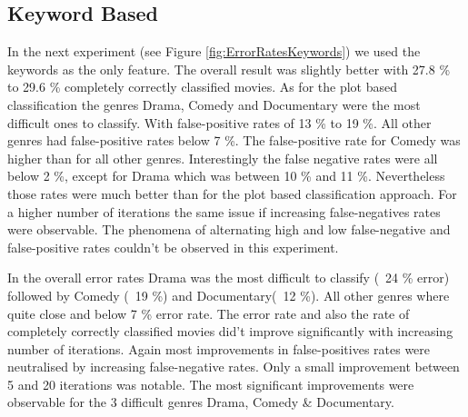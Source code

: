 \documentclass{vldb}
\begin{document}
\subsection{Keyword Based}
\par In the next experiment (see Figure \ref{fig:ErrorRatesKeywords})  we used the keywords as the only feature. The overall result was slightly better with 27.8 \% to 29.6 \% completely correctly classified movies.
As for the plot based classification the genres Drama, Comedy and Documentary were the most difficult  ones to classify. With false-positive rates of 13 \% to 19 \%. All other genres had false-positive rates below 7 \%. 
The false-positive rate for Comedy was higher than for all other genres. Interestingly the false negative rates were all below 2 \%, except for Drama which was between 10 \% and 11 \%. Nevertheless those rates were much better than for the plot based classification approach. For a higher number of iterations the same issue if increasing false-negatives rates were observable. The phenomena of alternating high and low false-negative and false-positive rates couldn’t be observed in this experiment.
\par In the overall error rates Drama was the most difficult to classify (~24 \% error) followed by Comedy (~19 \%) and Documentary(~12 \%). All other genres where quite close and below 7 \% error rate. The error rate and also the rate of completely correctly classified movies did’t improve significantly with increasing number of iterations. Again most improvements in false-positives rates were neutralised by increasing false-negative rates. Only a small improvement between 5 and 20 iterations was notable. The most significant improvements were observable for the 3 difficult genres Drama, Comedy \& Documentary.
\end{document}
